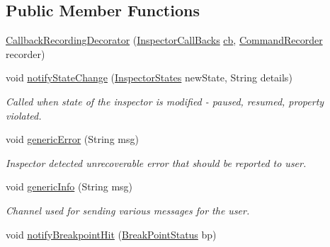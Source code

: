 \subsection*{Public Member Functions}
\begin{DoxyCompactItemize}
\item 
\hyperlink{classgov_1_1nasa_1_1jpf_1_1inspector_1_1client_1_1_callback_recording_decorator_a1b734dcba5bd6c733c9170b0c7252081}{Callback\+Recording\+Decorator} (\hyperlink{interfacegov_1_1nasa_1_1jpf_1_1inspector_1_1interfaces_1_1_inspector_call_backs}{Inspector\+Call\+Backs} \hyperlink{classgov_1_1nasa_1_1jpf_1_1inspector_1_1client_1_1_callback_recording_decorator_a12851029ed70d54263ba4d4a3e10ea90}{cb}, \hyperlink{classgov_1_1nasa_1_1jpf_1_1inspector_1_1client_1_1_command_recorder}{Command\+Recorder} recorder)
\item 
void \hyperlink{classgov_1_1nasa_1_1jpf_1_1inspector_1_1client_1_1_callback_recording_decorator_a6a85c38f4d1919e012c0a7e3d4ca185b}{notify\+State\+Change} (\hyperlink{enumgov_1_1nasa_1_1jpf_1_1inspector_1_1interfaces_1_1_commands_interface_1_1_inspector_states}{Inspector\+States} new\+State, String details)
\begin{DoxyCompactList}\small\item\em Called when state of the inspector is modified -\/ paused, resumed, property violated. \end{DoxyCompactList}\item 
void \hyperlink{classgov_1_1nasa_1_1jpf_1_1inspector_1_1client_1_1_callback_recording_decorator_aa0c74a68ad922f3093845355076bd382}{generic\+Error} (String msg)
\begin{DoxyCompactList}\small\item\em Inspector detected unrecoverable error that should be reported to user. \end{DoxyCompactList}\item 
void \hyperlink{classgov_1_1nasa_1_1jpf_1_1inspector_1_1client_1_1_callback_recording_decorator_ab0558583c20dbab8e8d483fa462270f8}{generic\+Info} (String msg)
\begin{DoxyCompactList}\small\item\em Channel used for sending various messages for the user. \end{DoxyCompactList}\item 
void \hyperlink{classgov_1_1nasa_1_1jpf_1_1inspector_1_1client_1_1_callback_recording_decorator_a97471d92651a8eb8886ae56fc728268c}{notify\+Breakpoint\+Hit} (\hyperlink{interfacegov_1_1nasa_1_1jpf_1_1inspector_1_1interfaces_1_1_break_point_status}{Break\+Point\+Status} bp)

\end{DoxyCompactItemize}
